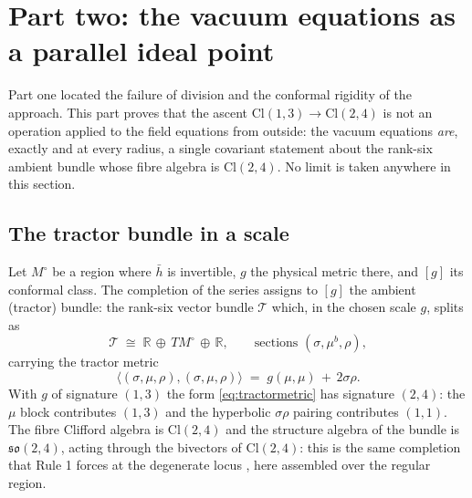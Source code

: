 \documentclass[11pt]{article}
\theoremstyle{definition}
\newcommand{\Cl}{\mathrm{Cl}}
\newcommand{\R}{\mathbb{R}}
\newcommand{\hb}{\bar{h}}
\newcommand{\ip}[2]{\langle #1, #2\rangle}
\begin{document}
\section{Part two: the vacuum equations as a parallel ideal point}\label{sec:tractor}

Part one located the failure of division and the conformal rigidity of the approach. This part proves that the ascent $\Cl(1,3) \to \Cl(2,4)$ is not an operation applied to the field equations from outside: the vacuum equations \emph{are}, exactly and at every radius, a single covariant statement about the rank-six ambient bundle whose fibre algebra is $\Cl(2,4)$. No limit is taken anywhere in this section.

\subsection{The tractor bundle in a scale}\label{subsec:tractorsetup}

Let $M^\circ$ be a region where $\hb$ is invertible, $g$ the physical metric there, and $[g]$ its conformal class. The completion of the series assigns to $[g]$ the ambient (tractor) bundle: the rank-six vector bundle $\mathcal{T}$ which, in the chosen scale $g$, splits as
\[
\mathcal{T} \;\cong\; \R \,\oplus\, TM^\circ \,\oplus\, \R, \qquad \text{sections } (\sigma, \mu^b, \rho),
\]
carrying the tractor metric
\begin{equation}\label{eq:tractormetric}
\ip{(\sigma,\mu,\rho)}{(\sigma,\mu,\rho)} \;=\; g(\mu,\mu) \,+\, 2\sigma\rho .
\end{equation}
With $g$ of signature $(1,3)$ the form \eqref{eq:tractormetric} has signature $(2,4)$: the $\mu$ block contributes $(1,3)$ and the hyperbolic $\sigma\rho$ pairing contributes $(1,1)$. The fibre Clifford algebra is $\Cl(2,4)$ and the structure algebra of the bundle is $\mathfrak{so}(2,4)$, acting through the bivectors of $\Cl(2,4)$: this is the same completion that Rule 1 forces at the degenerate locus \cite{ButlerT1, ButlerT4}, here assembled over the regular region.
\end{document}
